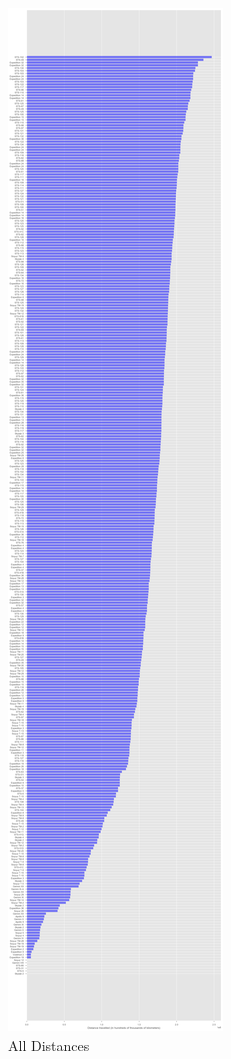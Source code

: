 \documentclass[sigconf]{acmart}
\begin{document}
\begin{figure}[htb]
  \centering\includegraphics[height=1.0\textheight]{images/fig1.png}
  \caption{All Distances}\label{f:fig1}
\end{figure}
\end{document}
